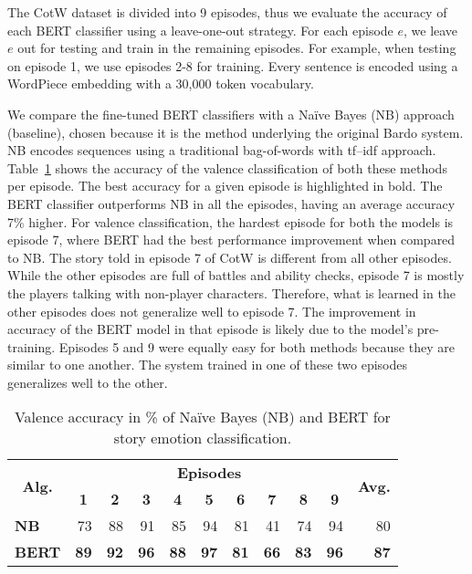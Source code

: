 The CotW dataset is divided into 9 episodes, thus we evaluate
the accuracy of each BERT classifier using a leave-one-out strategy.
For each episode $e$, we leave $e$ out for
testing and train in the remaining episodes. For example,
when testing on episode 1, we use episodes 2-8 for training.
Every sentence is encoded using a
WordPiece embedding \cite{wu2016google} with a 30,000 token vocabulary.

We compare the fine-tuned BERT classifiers with a Na\"ive
Bayes (NB) approach (baseline), chosen because it is the method underlying the original Bardo system. NB encodes sequences using a traditional bag-of-words with tf–idf approach.
Table~\ref{tab:valence} shows the accuracy of the valence classification of both these methods per episode. The best accuracy for a given episode is highlighted in bold. The BERT classifier outperforms NB in all the episodes, having an average accuracy 7\% higher.
For valence classification, the hardest episode for both the models is episode 7, where BERT had the best performance improvement when compared to NB. The story told in episode 7 of CotW is different from all other episodes. While the other episodes are full of battles and ability checks, episode 7 is mostly the players talking with non-player characters.
Therefore, what is learned in the other episodes does not generalize well to episode 7. The improvement in accuracy of the BERT model in that episode is likely due to the model's pre-training. Episodes 5 and 9 were equally easy for both methods because they are similar to one another. The system trained in one of these two episodes generalizes well to the other.

\begin{table}[t!]
\centering
\setlength{\tabcolsep}{4pt}
\begin{tabular}{crrrrrrrrrr}
\toprule
\multirow{2}{*}{\textbf{Alg.}} & \multicolumn{9}{c}{\textbf{Episodes}} & \multirow{2}{*}{\textbf{Avg.}} \\
\cmidrule{2-10}
& \multicolumn{1}{c}{\textbf{1}}   & \multicolumn{1}{c}{\textbf{2}}   & \multicolumn{1}{c}{\textbf{3}}  & \multicolumn{1}{c}{\textbf{4}} & \multicolumn{1}{c}{\textbf{5}}  & \multicolumn{1}{c}{\textbf{6}}  & \multicolumn{1}{c}{\textbf{7}} & \multicolumn{1}{c}{\textbf{8}}  & \multicolumn{1}{c}{\textbf{9}} &    \\
\midrule
\multicolumn{1}{l}{\textbf{NB}}   &   73 & 88  &  91 & 85   &  94 & 81  &  41 & 74   & 94    &   80 \\
\multicolumn{1}{l}{\textbf{BERT}}   &  \textbf{89}  & \textbf{92}  & \textbf{96}  &  \textbf{88} & \textbf{97}   & \textbf{81} & \textbf{66}   &  \textbf{83}   &  \textbf{96} &  \textbf{87}  \\
\bottomrule
\end{tabular}
\caption{Valence accuracy in \% of Na\"ive Bayes (NB) and BERT for story emotion classification.}
\label{tab:valence}
\end{table}

